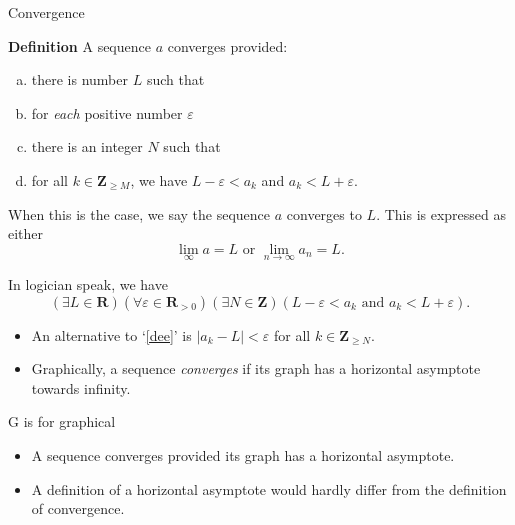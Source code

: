 \documentclass[portrait,fleqn,12pt]{beamer}
\newcommand{\reals}{\mathbf{R}}
\newenvironment{alphalist}
   {\begin{enumerate}[(a)]
       \addtolength{\itemsep}{-1.25\itemsep}}
     {\end{enumerate}}
\newcommand{\integers}{\mathbf{Z}}
\newenvironment{define}[1]{
  \textbf{Definition} #1}{}
\begin{document}
\begin{frame}{Convergence}

\begin{define} A sequence \(a\) converges provided:
\begin{alphalist}
\item there is number \(L\) such that
\item for \emph{each} positive number \(\varepsilon\) 
\item there is an  integer \(N\) such that
\item \label{dee} for all \(k \in \integers_{\geq M}\), we have
\(L  - \varepsilon < a_k\) and \(a_k < L + \varepsilon\).
\end{alphalist}
When this is the case, we say the sequence \(a\) converges to
\(L\). This is expressed as either
\[
  \lim_{\infty} a = L \mbox{ or } \lim_{n \to \infty} a_n = L.
\]
\end{define}

In logician speak, we have
\begin{equation*}
\left(\exists L \in \reals\right) 
\left(\forall \varepsilon \in \reals_{>0}\right)
\left(\exists N \in \integers\right)
\left(L  - \varepsilon < a_k \text{ and } a_k < L + \varepsilon  \right).
\end{equation*}
\end{frame}
\begin{frame}
\begin{itemize}
\item An alternative to `\ref{dee}' is \(|a_k - L | < \varepsilon\)
for all \(k \in \integers_{\geq N}\).

\item Graphically, a sequence \emph{converges} if its graph has a
horizontal asymptote towards infinity.

\end{itemize}
\end{frame}
\begin{frame}{G is for graphical}

\begin{itemize}

\item A sequence converges provided its graph has a horizontal asymptote.

\item A  definition of a horizontal asymptote 
would hardly differ from the definition of convergence.

\end{itemize}

\end{frame}
\end{document}
